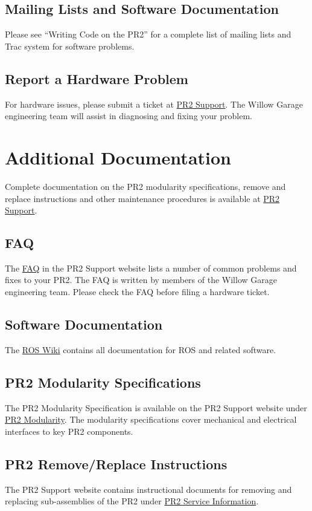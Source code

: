 \subsection{Mailing Lists and Software Documentation}

Please see ``Writing Code on the PR2'' for a complete list of mailing lists and Trac system for software problems.

\subsection{Report a Hardware Problem}

For hardware issues, please submit a ticket at \href{http://pr2support.willowgarage.com}{PR2 Support}. The Willow Garage engineering team will assist in diagnosing and fixing your problem.

\section{Additional Documentation}

Complete documentation on the PR2 modularity specifications, remove and replace instructions and other maintenance procedures is available at \href{http://pr2support.willowgarage.com}{PR2 Support}.

\subsection{FAQ}

The \href{http://pr2support.willowgarage.com/wiki/FAQ}{FAQ} in the PR2 Support website lists a number of common problems and fixes to your PR2. The FAQ is written by members of the Willow Garage engineering team. Please check the FAQ before filing a hardware ticket.

\subsection{Software Documentation}

The \href{http://www.ros.org/wiki}{ROS Wiki} contains all documentation for ROS and related software.

\subsection{PR2 Modularity Specifications}

The PR2 Modularity Specification is available on the PR2 Support website under \href{http://pr2support.willowgarage.com/wiki/PR2 Modularity}{PR2 Modularity}. The modularity specifications cover mechanical and electrical interfaces to key PR2 components.

\subsection{PR2 Remove/Replace Instructions}

The PR2 Support website contains instructional documents for removing and replacing sub-assemblies of the PR2 under \href{http://pr2support.willowgarage.com/wiki/PR2 Service Information}{PR2 Service Information}.
